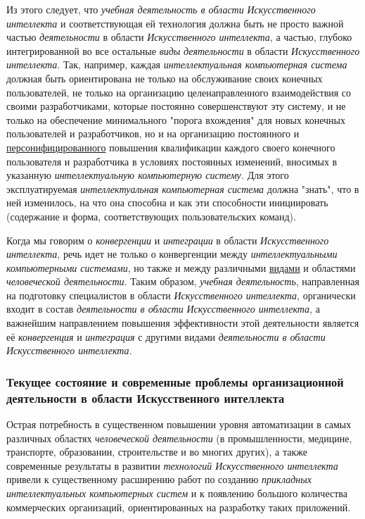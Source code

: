Из этого следует, что \textit{учебная деятельность в области} \textit{Искусственного интеллекта} и соответствующая ей технология должна быть не просто важной частью \textit{деятельности} в области \textit{Искусственного интеллекта}, а частью, глубоко интегрированной во все остальные \textit{виды} \textit{деятельности} в области \textit{Искусственного интеллекта}. Так, например, каждая \textit{интеллектуальная компьютерная система} должная быть ориентирована не только на обслуживание своих конечных пользователей, не только на организацию целенаправленного взаимодействия со своими разработчиками, которые постоянно совершенствуют эту систему, и не только на обеспечение минимального "порога вхождения"{} для новых конечных пользователей и разработчиков, но и на организацию постоянного и \underline{персонифицированного} повышения квалификации каждого своего конечного пользователя и разработчика в условиях постоянных изменений, вносимых в указанную \textit{интеллектуальную компьютерную систему.} Для этого эксплуатируемая \textit{интеллектуальная компьютерная система} должна "знать"{}, что в ней изменилось, на что она способна и как эти способности инициировать (содержание и форма, соответствующих пользовательских команд).

Когда мы говорим о \textit{конвергенции} и \textit{интеграции} в области \textit{Искусственного интеллекта}, речь идет не только о конвергенции между \textit{интеллектуальными компьютерными системами}, но также и между различными \underline{видами} и областями \textit{человеческой деятельности}. Таким образом, \textit{учебная деятельность}, направленная на подготовку специалистов в области \textit{Искусственного интеллекта}, органически входит в состав \textit{деятельности в области} \textit{Искусственного интеллекта}, а важнейшим направлением повышения эффективности этой деятельности является её \textit{конвергенция} и \textit{интеграция} с другими видами \textit{деятельности в области Искусственного интеллекта}.

\subsubsection{Текущее состояние и современные проблемы организационной деятельности в области Искусственного интеллекта}

Острая потребность в существенном повышении уровня автоматизации в самых различных областях \textit{человеческой деятельности} (в промышленности, медицине, транспорте, образовании, строительстве и во многих других), а также современные результаты в развитии \textit{технологий Искусственного интеллекта} привели к существенному расширению работ по созданию \textit{прикладных интеллектуальных компьютерных систем} и к появлению большого количества коммерческих организаций, ориентированных на разработку таких приложений.

